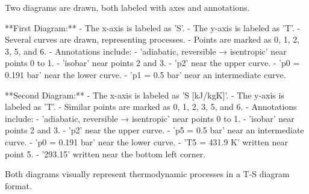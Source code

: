 Two diagrams are drawn, both labeled with axes and annotations.  

**First Diagram:**  
- The x-axis is labeled as 'S'.  
- The y-axis is labeled as 'T'.  
- Several curves are drawn, representing processes.  
- Points are marked as 0, 1, 2, 3, 5, and 6.  
- Annotations include:  
  - 'adiabatic, reversible → isentropic' near points 0 to 1.  
  - 'isobar' near points 2 and 3.  
  - 'p2' near the upper curve.  
  - 'p0 = 0.191 bar' near the lower curve.  
  - 'p1 = 0.5 bar' near an intermediate curve.  

**Second Diagram:**  
- The x-axis is labeled as 'S [kJ/kgK]'.  
- The y-axis is labeled as 'T'.  
- Similar points are marked as 0, 1, 2, 3, 5, and 6.  
- Annotations include:  
  - 'adiabatic, reversible → isentropic' near points 0 to 1.  
  - 'isobar' near points 2 and 3.  
  - 'p2' near the upper curve.  
  - 'p5 = 0.5 bar' near an intermediate curve.  
  - 'p0 = 0.191 bar' near the lower curve.  
  - 'T5 = 431.9 K' written near point 5.  
  - '293.15' written near the bottom left corner.  

Both diagrams visually represent thermodynamic processes in a T-S diagram format.